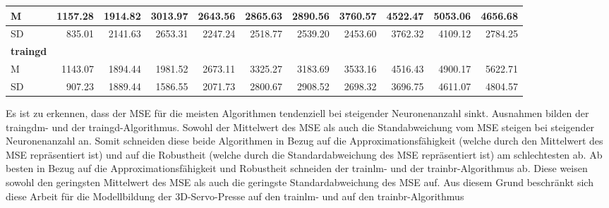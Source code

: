 \begin{table}[htbp]
\begin{adjustbox}{width=\textwidth}
\begin{tabular}{|l|r|r|r|r|r|r|r|r|r|r|}
			\midrule
			M     & 1157.28 & 1914.82 & 3013.97 & 2643.56 & 2865.63 & 2890.56 & 3760.57 & 4522.47 & 5053.06 & 4656.68 \\
			\midrule
			SD    & 835.01 & 2141.63 & 2653.31 & 2247.24 & 2518.77 & 2539.20 & 2453.60 & 3762.32 & 4109.12 & 2784.25 \\
			\midrule
			\textbf{traingd} &       &       &       &       &       &       &       &       &       &  \\
			\midrule
			M     & 1143.07 & 1894.44 & 1981.52 & 2673.11 & 3325.27 & 3183.69 & 3533.16 & 4516.43 & 4900.17 & 5622.71 \\
			\midrule
			SD    & 907.23 & 1889.44 & 1586.55 & 2071.73 & 2800.67 & 2908.52 & 2698.32 & 3696.75 & 4611.07 & 4804.57 \\
			\bottomrule
		\end{tabular}%
	\end{adjustbox}
	\label{tab:auswahl}%
\end{table}%
 
Es ist zu erkennen, dass der MSE für die meisten Algorithmen tendenziell bei steigender Neuronenanzahl sinkt. Ausnahmen bilden der traingdm- und der traingd-Algorithmus. Sowohl der Mittelwert des MSE als auch die Standabweichung vom MSE steigen bei steigender Neuronenanzahl an. Somit schneiden diese beide Algorithmen in Bezug auf die Approximationsfähigkeit (welche durch den Mittelwert des MSE repräsentiert ist) und auf die Robustheit (welche durch die Standardabweichung des MSE repräsentiert ist) am schlechtesten ab. Ab besten in Bezug auf die Approximationsfähigkeit und Robustheit schneiden der trainlm- und der trainbr-Algorithmus ab. Diese weisen sowohl den geringsten Mittelwert des MSE als auch die geringste Standardabweichung des MSE auf. Aus diesem Grund beschränkt sich diese Arbeit für die Modellbildung der 3D-Servo-Presse auf den trainlm- und auf den trainbr-Algorithmus 















  
  
  
  
  
 
